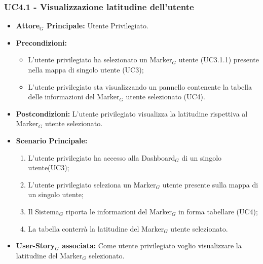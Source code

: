 \documentclass[10pt]{article}
\begin{document}
\begin{justify}
\subsubsection{\textbf{UC4.1 - Visualizzazione latitudine dell'utente}}
\label{UC4.1}
\begin{itemize}
     \item \textbf{Attore$_G$ Principale:} Utente Privilegiato.
     \item \textbf{Precondizioni:}
        \begin{itemize}
          \item L'utente privilegiato ha selezionato un Marker$_G$ utente (UC3.1.1) presente nella mappa di singolo utente (UC3);
          \item L'utente privilegiato sta visualizzando un pannello contenente la tabella delle informazioni del Marker$_G$ utente selezionato (UC4).
        \end{itemize}
      \item \textbf{Postcondizioni:} L'utente privilegiato visualizza la latitudine rispettiva al Marker$_G$ utente selezionato. 
      \item \textbf{Scenario Principale:}
        \begin{enumerate}
            \item L'utente privilegiato ha accesso alla Dashboard$_G$ di un singolo utente(UC3);
            \item L'utente privilegiato seleziona un Marker$_G$ utente presente sulla mappa di un singolo utente;
            \item Il Sistema$_G$ riporta le informazioni del Marker$_G$ in forma tabellare (UC4);
            \item La tabella conterrà la latitudine del Marker$_G$ utente selezionato.
        \end{enumerate}
     \item \textbf{User-Story$_G$ associata:}
       Come utente privilegiato voglio visualizzare la latitudine del Marker$_G$ selezionato.
\end{itemize}


\end{justify}
\end{document}
